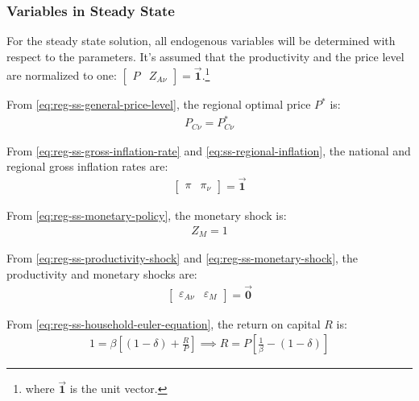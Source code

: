 \documentclass[
thesis.tex
]{subfiles}
\begin{document}

\subsubsection*{Variables in Steady State}


For the steady state solution, all endogenous variables will be determined with respect to the parameters. It's assumed that the productivity and the price level are normalized to one: $\left[ \begin{smallmatrix} P & Z_{A\nu} \end{smallmatrix} \right] = \vec{\bm{1}}$.\footnote{where $\vec{\bm{1}}$ is the unit vector.}

From \ref{eq:reg-ss-general-price-level}, the regional optimal price $P^\ast$ is:
\begin{align}
	P_{C\nu} = P_{C\nu}^\ast
\end{align}

From \ref{eq:reg-ss-gross-inflation-rate} and \ref{eq:ss-regional-inflation}, the national and regional gross inflation rates are:
\begin{align}
	\begin{bmatrix}
		\pi & \pi_{\nu}
	\end{bmatrix} = \vec{\bm{1}}
\end{align}

From \ref{eq:reg-ss-monetary-policy}, the monetary shock is:
\begin{align}
	Z_{M} = 1
\end{align}

From \ref{eq:reg-ss-productivity-shock} and \ref{eq:reg-ss-monetary-shock}, the productivity and monetary shocks are:
\begin{align}
	\begin{bmatrix}
		\varepsilon_{A\nu} & \varepsilon_{M}
	\end{bmatrix} = \vec{\bm{0}}
\end{align}

From \ref{eq:reg-ss-household-euler-equation}, the return on capital $R$ is:
\begin{align}
	\label{eq:reg-ss-return-on-capital}
	1 = \beta \left[ (1-\delta) + \frac{R}{P} \right] \implies 
	R = P\left[ \frac{1}{\beta} - (1-\delta) \right]
\end{align}
\end{document}

